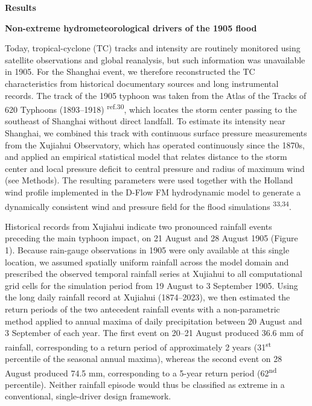 \documentclass[
]{article}
\begin{document}
\textbf{Results}

\textbf{Non-extreme hydrometeorological drivers of the 1905 flood}

Today, tropical-cyclone (TC) tracks and intensity are routinely
monitored using satellite observations and global reanalysis, but such
information was unavailable in 1905. For the Shanghai event, we
therefore reconstructed the TC characteristics from historical
documentary sources and long instrumental records. The track of the 1905
typhoon was taken from the Atlas of the Tracks of 620 Typhoons
(1893--1918) \textsuperscript{ref.30}, which locates the storm center
passing to the southeast of Shanghai without direct landfall. To
estimate its intensity near Shanghai, we combined this track with
continuous surface pressure measurements from the Xujiahui Observatory,
which has operated continuously since the 1870s, and applied an
empirical statistical model that relates distance to the storm center
and local pressure deficit to central pressure and radius of maximum
wind (see Methods). The resulting parameters were used together with the
Holland wind profile implemented in the D-Flow FM hydrodynamic model to
generate a dynamically consistent wind and pressure field for the flood
simulations \textsuperscript{33,34}.

Historical records from Xujiahui indicate two pronounced rainfall events
preceding the main typhoon impact, on 21 August and 28 August 1905
(Figure 1). Because rain-gauge observations in 1905 were only available
at this single location, we assumed spatially uniform rainfall across
the model domain and prescribed the observed temporal rainfall series at
Xujiahui to all computational grid cells for the simulation period from
19 August to 3 September 1905. Using the long daily rainfall record at
Xujiahui (1874--2023), we then estimated the return periods of the two
antecedent rainfall events with a non-parametric method applied to
annual maxima of daily precipitation between 20 August and 3 September
of each year. The first event on 20--21 August produced 36.6 mm of
rainfall, corresponding to a return period of approximately 2 years
(31\textsuperscript{st} percentile of the seasonal annual maxima),
whereas the second event on 28 August produced 74.5 mm, corresponding to
a 5-year return period (62\textsuperscript{nd} percentile). Neither
rainfall episode would thus be classified as extreme in a conventional,
single-driver design framework.
\end{document}
